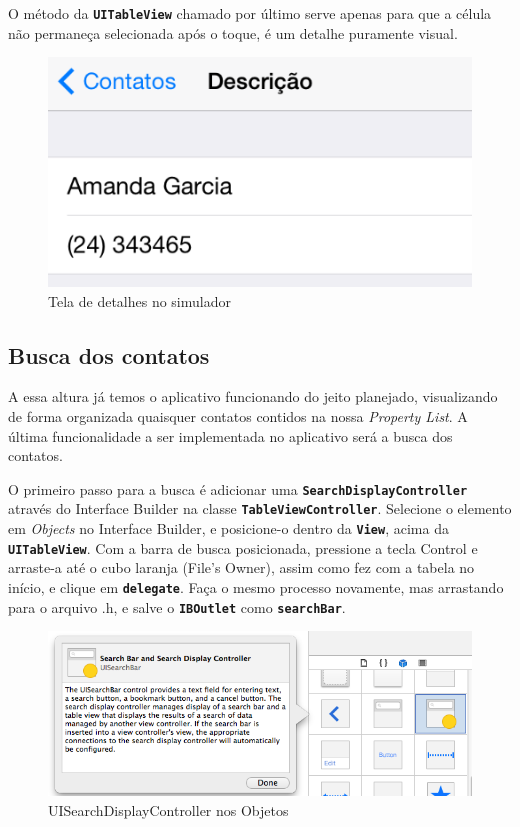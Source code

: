\documentclass[a4paper,12pt,brazil,doubleside]{book}
\begin{document}
\begin{singlespace}
O método da \texttt{\textbf{UITableView}} chamado por último serve apenas para que a célula não permaneça selecionada após o toque, é um detalhe puramente visual.

\begin{figure}[H]
  \centering
  \includegraphics[width=.75\textwidth]{figuras/table/table5.png}
  \caption{Tela de detalhes no simulador}
  \label{fig:a}
\end{figure}

\subsection{Busca dos contatos}


A essa altura já temos o aplicativo funcionando do jeito planejado, visualizando de forma organizada quaisquer contatos contidos na nossa \emph{Property List}. A última funcionalidade a ser implementada no aplicativo será a busca dos contatos.

O primeiro passo para a busca é adicionar uma \texttt{\textbf{SearchDisplayController}} através do Interface Builder na classe \texttt{\textbf{TableViewController}}. Selecione o elemento em \emph{Objects} no Interface Builder, e posicione-o dentro da \texttt{\textbf{View}}, acima da \texttt{\textbf{UITableView}}. Com a barra de busca posicionada, pressione a tecla Control e arraste-a até o cubo laranja (File's Owner), assim como fez com a tabela no início, e clique em \texttt{\textbf{delegate}}. Faça o mesmo processo novamente, mas arrastando para o arquivo .h, e salve o \texttt{\textbf{IBOutlet}} como \texttt{\textbf{searchBar}}.

\begin{figure}[H]
  \centering
  \includegraphics[width=.75\textwidth]{figuras/table/table2.png}
  \caption{UISearchDisplayController nos Objetos}
  \label{fig:a}
\end{figure}


\end{singlespace}
\end{document}
